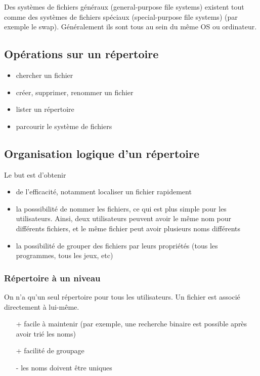 	Des systèmes de fichiers généraux (general-purpose file systems) existent tout comme des systèmes de fichiers spéciaux (special-purpose file systems) (par exemple le swap). Généralement ils sont tous au sein du même OS ou ordinateur.
	
	
	\subsection{Opérations sur un répertoire}
	
	\begin{itemize}
		\item chercher un fichier
		\item créer, supprimer, renommer un fichier
		\item lister un répertoire
		\item parcourir le système de fichiers
	\end{itemize}
	
	\subsection{Organisation logique d'un répertoire}
	
	Le but est d'obtenir
	
	\begin{itemize}
		\item de l'efficacité, notamment localiser un fichier rapidement
		\item la posssibilité de nommer les fichiers, ce qui est plus simple pour les utilisateurs. Ainsi, deux utilisateurs peuvent avoir le même nom pour différents fichiers, et le même fichier peut avoir plusieurs noms différents
		\item la possibilité de grouper des fichiers par leurs propriétés (tous les programmes, tous les jeux, etc)
	\end{itemize}
	
		\subsubsection{Répertoire à un niveau}
		
		On n'a qu'un seul répertoire pour tous les utilisateurs. Un fichier est associé directement à lui-même.
		
		
		\begin{itemize}
			\item[+] facile à maintenir (par exemple, une recherche binaire est possible après avoir trié les noms) 
			\item[+] facilité de groupage
			\item[-] les noms doivent être uniques
		\end{itemize}
		
